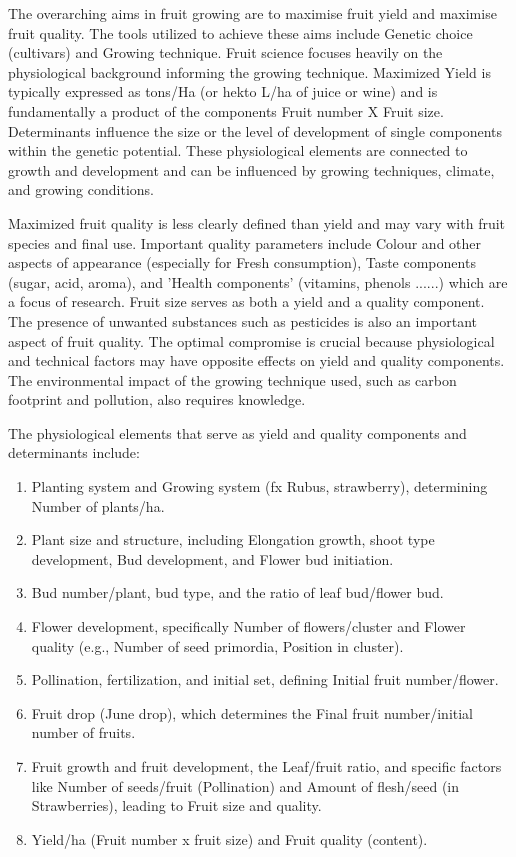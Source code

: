 \vspace{1em}
The overarching aims in fruit growing are to maximise fruit yield and maximise fruit quality. The tools utilized to achieve these aims include Genetic choice (cultivars) and Growing technique. Fruit science focuses heavily on the physiological background informing the growing technique. Maximized Yield is typically expressed as tons/Ha (or hekto L/ha of juice or wine) and is fundamentally a product of the components Fruit number X Fruit size. Determinants influence the size or the level of development of single components within the genetic potential. These physiological elements are connected to growth and development and can be influenced by growing techniques, climate, and growing conditions.

\vspace{0.5em}
Maximized fruit quality is less clearly defined than yield and may vary with fruit species and final use. Important quality parameters include Colour and other aspects of appearance (especially for Fresh consumption), Taste components (sugar, acid, aroma), and 'Health components' (vitamins, phenols ......) which are a focus of research. Fruit size serves as both a yield and a quality component. The presence of unwanted substances such as pesticides is also an important aspect of fruit quality. The optimal compromise is crucial because physiological and technical factors may have opposite effects on yield and quality components. The environmental impact of the growing technique used, such as carbon footprint and pollution, also requires knowledge.

\vspace{0.5em}
The physiological elements that serve as yield and quality components and determinants include: 

\begin{enumerate} 
    \item Planting system and Growing system (fx Rubus, strawberry), determining Number of plants/ha. 
    \item Plant size and structure, including Elongation growth, shoot type development, Bud development, and Flower bud initiation. 
    \item Bud number/plant, bud type, and the ratio of leaf bud/flower bud. 
    \item Flower development, specifically Number of flowers/cluster and Flower quality (e.g., Number of seed primordia, Position in cluster). 
    \item Pollination, fertilization, and initial set, defining Initial fruit number/flower. 
    \item Fruit drop (June drop), which determines the Final fruit number/initial number of fruits. 
    \item Fruit growth and fruit development, the Leaf/fruit ratio, and specific factors like Number of seeds/fruit (Pollination) and Amount of flesh/seed (in Strawberries), leading to Fruit size and quality. 
    \item Yield/ha (Fruit number x fruit size) and Fruit quality (content). 
\end{enumerate}

